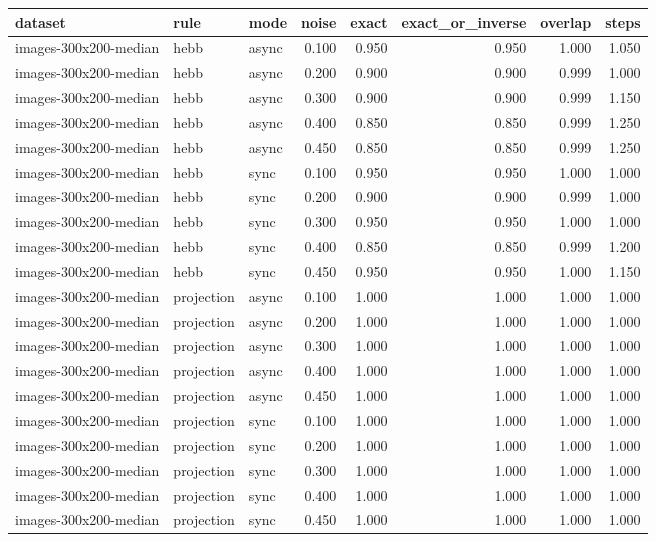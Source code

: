 \begin{tabular}{lllrrrrr}
\toprule
dataset & rule & mode & noise & exact & exact\_or\_inverse & overlap & steps \\
\midrule
images-300x200-median & hebb & async & 0.100 & 0.950 & 0.950 & 1.000 & 1.050 \\
images-300x200-median & hebb & async & 0.200 & 0.900 & 0.900 & 0.999 & 1.000 \\
images-300x200-median & hebb & async & 0.300 & 0.900 & 0.900 & 0.999 & 1.150 \\
images-300x200-median & hebb & async & 0.400 & 0.850 & 0.850 & 0.999 & 1.250 \\
images-300x200-median & hebb & async & 0.450 & 0.850 & 0.850 & 0.999 & 1.250 \\
images-300x200-median & hebb & sync & 0.100 & 0.950 & 0.950 & 1.000 & 1.000 \\
images-300x200-median & hebb & sync & 0.200 & 0.900 & 0.900 & 0.999 & 1.000 \\
images-300x200-median & hebb & sync & 0.300 & 0.950 & 0.950 & 1.000 & 1.000 \\
images-300x200-median & hebb & sync & 0.400 & 0.850 & 0.850 & 0.999 & 1.200 \\
images-300x200-median & hebb & sync & 0.450 & 0.950 & 0.950 & 1.000 & 1.150 \\
images-300x200-median & projection & async & 0.100 & 1.000 & 1.000 & 1.000 & 1.000 \\
images-300x200-median & projection & async & 0.200 & 1.000 & 1.000 & 1.000 & 1.000 \\
images-300x200-median & projection & async & 0.300 & 1.000 & 1.000 & 1.000 & 1.000 \\
images-300x200-median & projection & async & 0.400 & 1.000 & 1.000 & 1.000 & 1.000 \\
images-300x200-median & projection & async & 0.450 & 1.000 & 1.000 & 1.000 & 1.000 \\
images-300x200-median & projection & sync & 0.100 & 1.000 & 1.000 & 1.000 & 1.000 \\
images-300x200-median & projection & sync & 0.200 & 1.000 & 1.000 & 1.000 & 1.000 \\
images-300x200-median & projection & sync & 0.300 & 1.000 & 1.000 & 1.000 & 1.000 \\
images-300x200-median & projection & sync & 0.400 & 1.000 & 1.000 & 1.000 & 1.000 \\
images-300x200-median & projection & sync & 0.450 & 1.000 & 1.000 & 1.000 & 1.000 \\
\bottomrule
\end{tabular}
